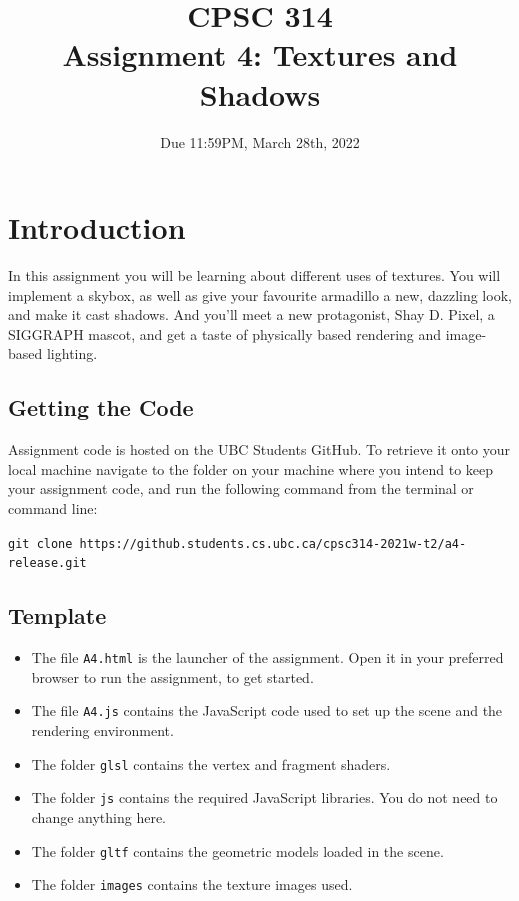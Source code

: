 \documentclass[12pt]{exam}
\begin{document}

\title{CPSC 314\\
  Assignment 4: Textures and Shadows}
\date{Due 11:59PM, March 28th, 2022}

\maketitle

\section{Introduction}


In this assignment you will be learning about different uses of textures. You will implement a skybox, as well as give your favourite armadillo a new, dazzling look, and make it cast shadows. And you'll meet a new protagonist, Shay D. Pixel, a SIGGRAPH mascot, and get a taste of physically based rendering and image-based lighting.

\subsection{Getting the Code}

Assignment code is hosted on the UBC Students GitHub. To retrieve it
onto your local machine navigate to the folder on your machine where you intend to keep your
assignment code, and run the following command from the terminal or command line:

\medskip
{\tt git clone https://github.students.cs.ubc.ca/cpsc314-2021w-t2/a4-release.git}

\subsection{Template}

\begin{itemize}

\item The file {\tt A4.html} is the launcher of the assignment. Open it in your preferred browser to run the assignment, to get started.

\item The file {\tt A4.js} contains the JavaScript code used to set up the scene and the rendering
    environment.

\item The folder {\tt glsl} contains the vertex and fragment shaders.

\item The folder {\tt js} contains the required JavaScript libraries. You do not need to change anything here.

\item The folder {\tt gltf} contains the geometric models loaded in the scene.

\item The folder {\tt images} contains the texture images used.

\end{itemize}
\end{document}

